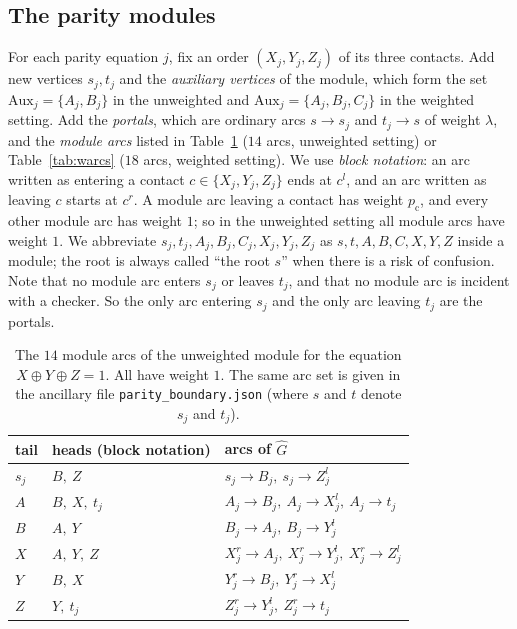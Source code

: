 \documentclass[11pt]{amsart}
\theoremstyle{definition}
\theoremstyle{remark}
\numberwithin{equation}{section}
\newcommand{\Aux}{\mathrm{Aux}}
\newcommand{\pc}{p_{\mathrm{c}}}
\newcommand{\Gh}{\widehat{G}}
\begin{document}
\subsection{The parity modules}\label{sec:module}
For each parity equation $j$, fix an order $(X_j,Y_j,Z_j)$ of its three contacts. Add new vertices $s_j,t_j$ and the \emph{auxiliary vertices} of the module, which form the set $\Aux_j=\{A_j,B_j\}$ in the unweighted and $\Aux_j=\{A_j,B_j,C_j\}$ in the weighted setting. Add the \emph{portals}, which are ordinary arcs $s\to s_j$ and $t_j\to s$ of weight $\lambda$, and the \emph{module arcs} listed in Table~\ref{tab:arcs} ($14$ arcs, unweighted setting) or Table~\ref{tab:warcs} ($18$ arcs, weighted setting). We use \emph{block notation}: an arc written as entering a contact $c\in\{X_j,Y_j,Z_j\}$ ends at $c^l$, and an arc written as leaving $c$ starts at $c^r$. A module arc leaving a contact has weight $\pc$, and every other module arc has weight $1$; so in the unweighted setting all module arcs have weight $1$. We abbreviate $s_j,t_j,A_j,B_j,C_j,X_j,Y_j,Z_j$ as $s,t,A,B,C,X,Y,Z$ inside a module; the root is always called ``the root $s$'' when there is a risk of confusion. Note that no module arc enters $s_j$ or leaves $t_j$, and that no module arc is incident with a checker. So the only arc entering $s_j$ and the only arc leaving $t_j$ are the portals.

\begin{table}[ht]
\centering
\begin{tabular}{@{}lll@{}}
\toprule
tail & heads (block notation) & arcs of $\Gh$ \\
\midrule
$s_j$ & $B,\ Z$ & $s_j\to B_j,\ s_j\to Z_j^l$\\
$A$ & $B,\ X,\ t_j$ & $A_j\to B_j,\ A_j\to X_j^l,\ A_j\to t_j$\\
$B$ & $A,\ Y$ & $B_j\to A_j,\ B_j\to Y_j^l$\\
$X$ & $A,\ Y,\ Z$ & $X_j^r\to A_j,\ X_j^r\to Y_j^l,\ X_j^r\to Z_j^l$\\
$Y$ & $B,\ X$ & $Y_j^r\to B_j,\ Y_j^r\to X_j^l$\\
$Z$ & $Y,\ t_j$ & $Z_j^r\to Y_j^l,\ Z_j^r\to t_j$\\
\bottomrule
\end{tabular}
\medskip
\caption{The $14$ module arcs of the unweighted module for the equation $X\oplus Y\oplus Z=1$. All have weight $1$. The same arc set is given in the ancillary file \texttt{parity\_boundary.json} (where $s$ and $t$ denote $s_j$ and $t_j$).}
\label{tab:arcs}
\end{table}
\end{document}
